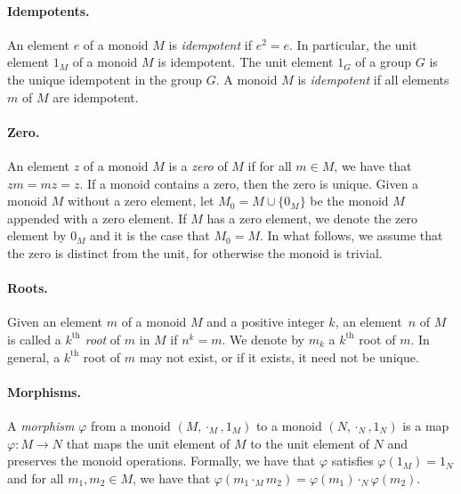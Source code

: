 \documentclass{llncs}
\begin{document}
\paragraph*{Idempotents.}
An element $e$ of a monoid $M$ is \emph{idempotent} if $e^2 = e$. 
In particular, the unit element $1_M$ of a monoid $M$ is idempotent.
The unit element $1_G$ of a group $G$ is the unique idempotent in the group $G$.
A monoid $M$ is \emph{idempotent} if all elements $m$ of $M$ are idempotent.

\paragraph*{Zero.} 
An element $z$ of a monoid $M$ is a \emph{zero} of $M$ if for all $m \in M$, we have that $zm = mz = z$. 
If a monoid contains a zero, then the zero is unique.
Given a monoid $M$ without a zero element, let $M_0 = M \cup \{0_M\}$ be the monoid $M$ appended with a zero element. If $M$ has a zero element, we denote the zero element by $0_M$ and it is the case that $M_0 = M$. In what follows, we assume that the zero is distinct from the unit, for otherwise the monoid is trivial.

\paragraph*{Roots.}
Given an element \(m\) of a monoid \(M\) and a positive integer \(k\), an element~\(n\) of \(M\) is called a \emph{\(k^{\text{th}}\) root} of \(m\) in \(M\) if \(n^k = m\). 
We denote by \(m_k\) a \(k^{\text{th}}\) root of \(m\).
In general, a \(k^{\text{th}}\) root of \(m\) may not exist, or if it exists, it need not be unique.

\paragraph*{Morphisms.}
A \emph{morphism} \(\varphi\) from a monoid $(M, \cdot_{M}, 1_{M})$ to a monoid $(N, \cdot_{N}, 1_{N})$ is a map $\varphi \colon M \to N$ that maps the unit element of \(M\) to the unit element of \(N\) and preserves the monoid operations.
Formally, we have that \(\varphi\) satisfies $\varphi(1_{M}) = 1_{N}$ and for all $m_1, m_2 \in M$, we have that $\varphi(m_1 \cdot_{M} m_2) = \varphi(m_1) \cdot_{N} \varphi(m_2)$.
\end{document}
